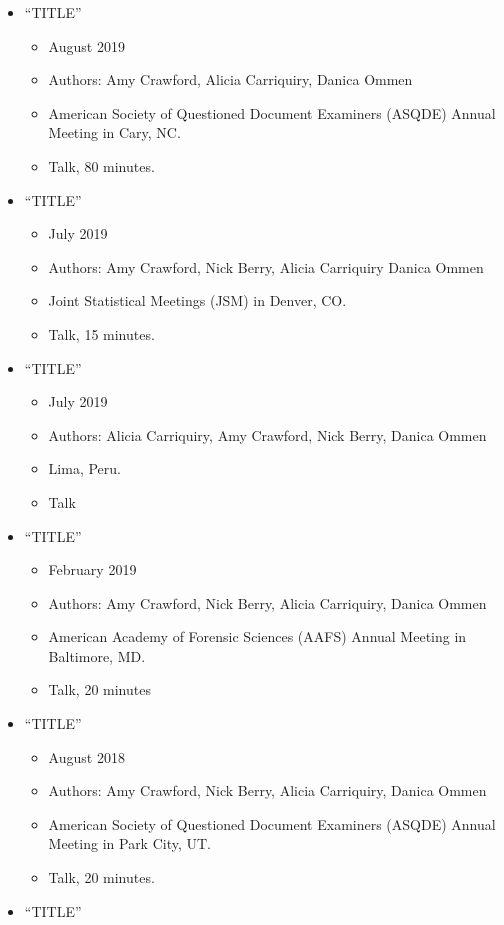 \documentclass[]{book}
\providecommand{\tightlist}{%
  \setlength{\itemsep}{0pt}\setlength{\parskip}{0pt}}
\begin{document}
\begin{itemize}
\tightlist
\item
  ``TITLE''

  \begin{itemize}
  \tightlist
  \item
    August 2019
  \item
    Authors: Amy Crawford, Alicia Carriquiry, Danica Ommen
  \item
    American Society of Questioned Document Examiners (ASQDE) Annual Meeting in Cary, NC.
  \item
    Talk, 80 minutes.
  \end{itemize}
\item
  ``TITLE''

  \begin{itemize}
  \tightlist
  \item
    July 2019
  \item
    Authors: Amy Crawford, Nick Berry, Alicia Carriquiry Danica Ommen
  \item
    Joint Statistical Meetings (JSM) in Denver, CO.
  \item
    Talk, 15 minutes.
  \end{itemize}
\item
  ``TITLE''

  \begin{itemize}
  \tightlist
  \item
    July 2019
  \item
    Authors: Alicia Carriquiry, Amy Crawford, Nick Berry, Danica Ommen
  \item
    Lima, Peru.
  \item
    Talk
  \end{itemize}
\item
  ``TITLE''

  \begin{itemize}
  \tightlist
  \item
    February 2019
  \item
    Authors: Amy Crawford, Nick Berry, Alicia Carriquiry, Danica Ommen
  \item
    American Academy of Forensic Sciences (AAFS) Annual Meeting in Baltimore, MD.
  \item
    Talk, 20 minutes
  \end{itemize}
\item
  ``TITLE''

  \begin{itemize}
  \tightlist
  \item
    August 2018
  \item
    Authors: Amy Crawford, Nick Berry, Alicia Carriquiry, Danica Ommen
  \item
    American Society of Questioned Document Examiners (ASQDE) Annual Meeting in Park City, UT.
  \item
    Talk, 20 minutes.
  \end{itemize}
\item
  ``TITLE''


\end{itemize}
\end{document}

